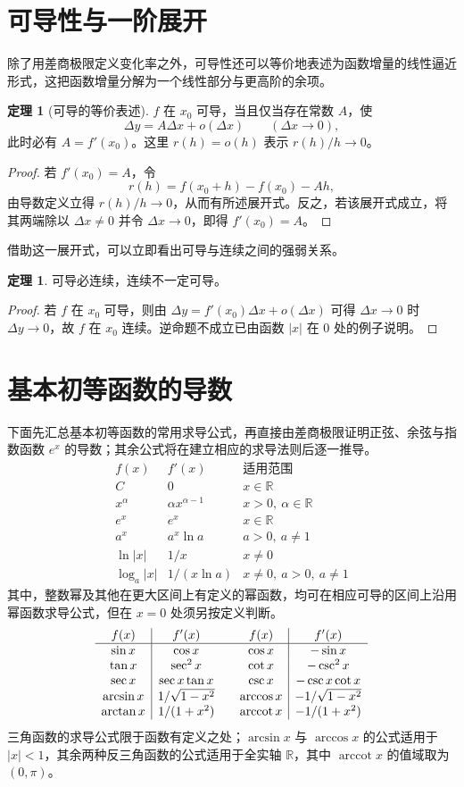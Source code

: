 \documentclass[UTF8,fontset=fandol,a4paper,12pt]{ctexart}
\newcommand{\R}{\mathbb R}
\theoremstyle{definition}
\newtheorem{theorem}[definition]{定理}
\begin{document}
\section{可导性与一阶展开}
除了用差商极限定义变化率之外，可导性还可以等价地表述为函数增量的线性逼近形式，这把函数增量分解为一个线性部分与更高阶的余项。

\begin{theorem}[可导的等价表述]
$f$ 在 $x_0$ 可导，当且仅当存在常数 $A$，使
\[
 \Delta y=A\Delta x+o(\Delta x)\qquad(\Delta x\to0),
\]
此时必有 $A=f'(x_0)$。这里 $r(h)=o(h)$ 表示 $r(h)/h\to0$。
\end{theorem}
\begin{proof}
若 $f'(x_0)=A$，令
\[
 r(h)=f(x_0+h)-f(x_0)-Ah,
\]
由导数定义立得 $r(h)/h\to0$，从而有所述展开式。反之，若该展开式成立，将其两端除以 $\Delta x\ne0$ 并令 $\Delta x\to0$，即得 $f'(x_0)=A$。
\end{proof}

借助这一展开式，可以立即看出可导与连续之间的强弱关系。

\begin{theorem}
可导必连续，连续不一定可导。
\end{theorem}
\begin{proof}
若 $f$ 在 $x_0$ 可导，则由 $\Delta y=f'(x_0)\Delta x+o(\Delta x)$ 可得 $\Delta x\to0$ 时 $\Delta y\to0$，故 $f$ 在 $x_0$ 连续。逆命题不成立已由函数 $|x|$ 在 $0$ 处的例子说明。
\end{proof}

\section{基本初等函数的导数}
下面先汇总基本初等函数的常用求导公式，再直接由差商极限证明正弦、余弦与指数函数 $e^x$ 的导数；其余公式将在建立相应的求导法则后逐一推导。
\[
\begin{array}{c|c|l}
 f(x)&f'(x)&\text{适用范围}\\\hline
 C&0&x\in\R\\
 x^\alpha&\alpha x^{\alpha-1}&x>0,\ \alpha\in\R\\
 e^x&e^x&x\in\R\\
 a^x&a^x\ln a&a>0,\ a\ne1\\
 \ln|x|&1/x&x\ne0\\
 \log_a|x|&1/(x\ln a)&x\ne0,\ a>0,\ a\ne1
\end{array}
\]
其中，整数幂及其他在更大区间上有定义的幂函数，均可在相应可导的区间上沿用幂函数求导公式，但在 $x=0$ 处须另按定义判断。
\[
\begin{array}{c|c@{\qquad}c|c}
 f(x)&f'(x)&f(x)&f'(x)\\\hline
 \sin x&\cos x&\cos x&-\sin x\\
 \tan x&\sec^2x&\cot x&-\csc^2x\\
 \sec x&\sec x\tan x&\csc x&-\csc x\cot x\\
 \arcsin x&1/\sqrt{1-x^2}&\arccos x&-1/\sqrt{1-x^2}\\
 \arctan x&1/(1+x^2)&\operatorname{arccot}x&-1/(1+x^2)
\end{array}
\]
三角函数的求导公式限于函数有定义之处；$\arcsin x$ 与 $\arccos x$ 的公式适用于 $|x|<1$，其余两种反三角函数的公式适用于全实轴 $\R$，其中 $\operatorname{arccot}x$ 的值域取为 $(0,\pi)$。
\end{document}
